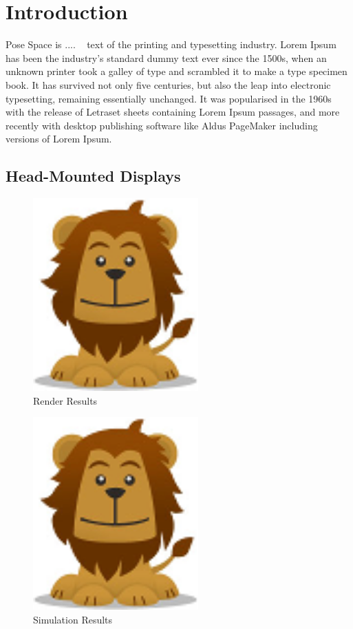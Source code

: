 \section{Introduction}
Pose Space is .... ~\cite{Lewis2000} text of the printing and typesetting industry. Lorem Ipsum has been the industry's standard dummy text ever since the 1500s, when an unknown printer took a galley of type and scrambled it to make a type specimen book. It has survived not only five centuries, but also the leap into electronic typesetting, remaining essentially unchanged. It was popularised in the 1960s with the release of Letraset sheets containing Lorem Ipsum passages, and more recently with desktop publishing software like Aldus PageMaker including versions of Lorem Ipsum.

\subsection{Head-Mounted Displays}


\begin{figure}[!t]
\centering
\includegraphics[width=2.5in]{images/picture.png}
\caption{Render Results}
\label{fig_render}
\end{figure}

\begin{figure}[!t]
\centering
\includegraphics[width=2.5in]{images/picture.png}
\caption{Simulation Results}
\label{fig_sim}
\end{figure}


